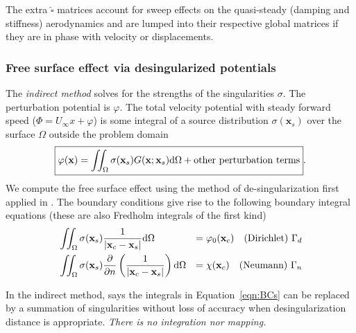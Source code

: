 \documentclass[10pt]{article}
\newcommand{\pp}[2]{\frac{\partial #1}{\partial #2}}
\newcommand{\mbf}[1]{\mathbf{#1}}
\newcommand{\be}{\begin{eqnarray}}
\newcommand{\ee}{\end{eqnarray}}
\newcommand{\beq}{\begin{equation}
    \begin{aligned}
        }
\newcommand{\eeq}{\end{aligned}
\end{equation}
}
\newcommand{\Uinf}{U_{\infty}}
\newcommand{\tn}[1]{\textnormal{#1}}
\begin{document}
% 
The extra $\hat{\square}$ matrices account for sweep effects on the quasi-steady (damping and stiffness) aerodynamics and are lumped into their respective global matrices if they are in phase with velocity or displacements.

\subsubsection{Free surface effect via desingularized potentials}

The \emph{indirect method} solves for the strengths of the singularities $\sigma$.
The perturbation potential is $\varphi$.
The total velocity potential with steady forward speed ($\Phi = \Uinf x + \varphi $) is some integral of a source distribution $\sigma(\mbf{x}_s)$ over the surface $\Omega$ outside the problem domain
\be
\label{eqn:Indirect}
\boxed{
    \varphi(\mbf{x}) = \iint_\Omega \sigma(\mbf{x}_s) G(\mbf{x};\mbf{x}_s) \tn{d}\Omega
    + \tn{other perturbation terms}
}
.
\ee
We compute the free surface effect using the method of de-singularization first applied in \citet{Cao1991}.
The boundary conditions give rise to the following boundary integral equations (these are also Fredholm integrals of the first kind)
\beq
\label{eqn:BCs}
&
\iint_{\Omega}\sigma(\mbf{x}_s)\frac{1}{\left| \mbf{x}_c - \mbf{x}_s \right| } \tn{d} \Omega & = \varphi_0(\mbf{x}_c) \quad \tn{(Dirichlet) } \Gamma_d
\\
& \iint_{\Omega} \sigma(\mbf{x}_s) \pp{}{n}\left(\frac{1}{\left| \mbf{x}_c - \mbf{x}_s\right|}\right)\tn{d} \Omega & = \chi(\mbf{x}_c) \quad \tn{(Neumann) } \Gamma_n
\eeq
In the indirect method, \citet{Cao1991} says the integrals in Equation~\eqref{eqn:BCs} can be replaced by a summation of singularities without loss of accuracy when desingularization distance is appropriate.
\emph{There is no integration nor mapping.}
\end{document}
